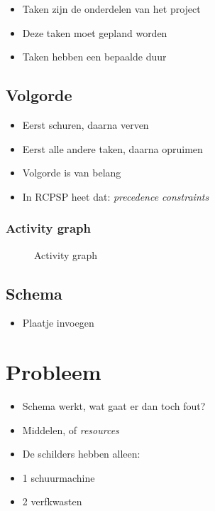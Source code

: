 \documentclass{beamer}
\theoremstyle{definition}
\newcommand{\inputtikz}[1]{}
\begin{document}
\begin{frame}
	\begin{itemize}
		\item Taken zijn de onderdelen van het project
		\item Deze taken moet gepland worden
		\item Taken hebben een bepaalde duur
	\end{itemize}
\end{frame}

\subsection{Volgorde}
\begin{frame}
	\begin{itemize}
		\item Eerst schuren, daarna verven
		\item Eerst alle andere taken, daarna opruimen
		\item Volgorde is van belang
		\item In RCPSP heet dat: \emph{precedence constraints}
	\end{itemize}
\end{frame}

\begin{frame}
	\frametitle{Activity graph}
	\vspace{-1em}
	\begin{figure}[ht]
		\makebox[\textwidth][c]{\resizebox{.8\paperwidth}{!}{
			\inputtikz{activity_graph_simple}
		}}
		\vspace{-1em}
		\caption{Activity graph}
		\label{fig:activity_graph}
	\end{figure}
\end{frame}

\subsection{Schema}
\begin{frame}
	\begin{itemize}
		\item Plaatje invoegen
	\end{itemize}
\end{frame}

\section{Probleem}
\begin{frame}
	\begin{itemize}
		\item Schema werkt, wat gaat er dan toch fout?
		\item Middelen, of \emph{resources}
		\item De schilders hebben alleen:
		\item 1 schuurmachine
		\item 2 verfkwasten
	\end{itemize}
\end{frame}
\end{document}
